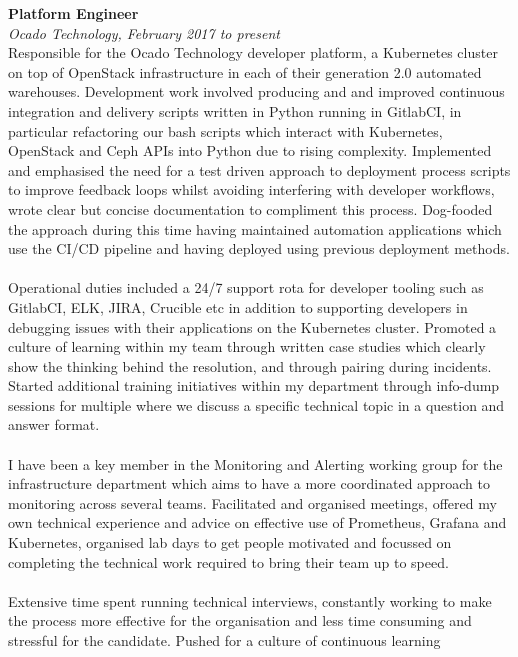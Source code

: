 \documentclass{article}
\begin{document}
\begin{flushleft}
\textbf{Platform Engineer}\\
\textit{Ocado Technology, February 2017 to present}\\[5pt]
Responsible for the Ocado Technology developer platform, a Kubernetes cluster on top of OpenStack infrastructure in each of their generation 2.0 automated warehouses. Development work involved producing and and improved continuous integration and delivery scripts written in Python running in GitlabCI, in particular refactoring our bash scripts which interact with Kubernetes, OpenStack and Ceph APIs into Python due to rising complexity. Implemented and emphasised the need for a test driven approach to deployment process scripts to improve feedback loops whilst avoiding interfering with developer workflows, wrote clear but concise documentation to compliment this process. Dog-fooded the approach during this time having maintained automation applications which use the CI/CD pipeline and having deployed using previous deployment methods.


\paragraph{}Operational duties included a 24/7 support rota for developer tooling such as GitlabCI, ELK, JIRA, Crucible etc in addition to supporting developers in debugging issues with their applications on the Kubernetes cluster. Promoted a culture of learning within my team through written case studies which clearly show the thinking behind the resolution, and through pairing during incidents. Started additional training initiatives within my department through info-dump sessions for multiple where we discuss a specific technical topic in a question and answer format.

\paragraph{}I have been a key member in the Monitoring and Alerting working group for the infrastructure department which aims to have a more coordinated approach to monitoring across several teams. Facilitated and organised meetings, offered my own technical experience and advice on effective use of Prometheus, Grafana and Kubernetes, organised lab days to get people motivated and focussed on completing the technical work required to bring their team up to speed. 

\paragraph{}Extensive time spent running technical interviews, constantly working to make the process more effective for the organisation and less time consuming and stressful for the candidate. Pushed for a culture of continuous learning 


\end{flushleft}
\end{document}
